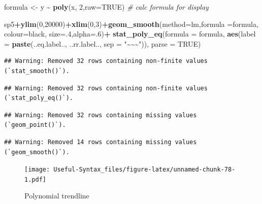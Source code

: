 \documentclass[
]{article}
\newenvironment{Shaded}{\begin{snugshade}}{\end{snugshade}}
\newcommand{\AttributeTok}[1]{\textcolor[rgb]{0.13,0.29,0.53}{#1}}
\newcommand{\CommentTok}[1]{\textcolor[rgb]{0.56,0.35,0.01}{\textit{#1}}}
\newcommand{\ConstantTok}[1]{\textcolor[rgb]{0.56,0.35,0.01}{#1}}
\newcommand{\DecValTok}[1]{\textcolor[rgb]{0.00,0.00,0.81}{#1}}
\newcommand{\FunctionTok}[1]{\textcolor[rgb]{0.13,0.29,0.53}{\textbf{#1}}}
\newcommand{\NormalTok}[1]{#1}
\newcommand{\OtherTok}[1]{\textcolor[rgb]{0.56,0.35,0.01}{#1}}
\newcommand{\SpecialCharTok}[1]{\textcolor[rgb]{0.81,0.36,0.00}{\textbf{#1}}}
\newcommand{\StringTok}[1]{\textcolor[rgb]{0.31,0.60,0.02}{#1}}
\begin{document}
\begin{Shaded}
\begin{Highlighting}[]
\NormalTok{formula }\OtherTok{\textless{}{-}}\NormalTok{ y }\SpecialCharTok{\textasciitilde{}} \FunctionTok{poly}\NormalTok{(x, }\DecValTok{2}\NormalTok{,}\AttributeTok{raw=}\ConstantTok{TRUE}\NormalTok{) }\CommentTok{\# calc formula for display}

\NormalTok{sp5}\SpecialCharTok{+}\FunctionTok{ylim}\NormalTok{(}\DecValTok{0}\NormalTok{,}\DecValTok{20000}\NormalTok{)}\SpecialCharTok{+}\FunctionTok{xlim}\NormalTok{(}\DecValTok{0}\NormalTok{,}\DecValTok{3}\NormalTok{)}\SpecialCharTok{+}\FunctionTok{geom\_smooth}\NormalTok{(}\AttributeTok{method=}\StringTok{\textquotesingle{}lm\textquotesingle{}}\NormalTok{,}\AttributeTok{formula =}\NormalTok{formula,}
                                        \AttributeTok{colour=}\StringTok{\textquotesingle{}black\textquotesingle{}}\NormalTok{, }\AttributeTok{size=}\NormalTok{.}\DecValTok{4}\NormalTok{,}\AttributeTok{alpha=}\NormalTok{.}\DecValTok{6}\NormalTok{)}\SpecialCharTok{+}
  \FunctionTok{stat\_poly\_eq}\NormalTok{(}\AttributeTok{formula =}\NormalTok{ formula,}
               \FunctionTok{aes}\NormalTok{(}\AttributeTok{label =} \FunctionTok{paste}\NormalTok{(..eq.label.., ..rr.label..,}
                                                        \AttributeTok{sep =} \StringTok{"\textasciitilde{}\textasciitilde{}\textasciitilde{}"}\NormalTok{)), }\AttributeTok{parse =} \ConstantTok{TRUE}\NormalTok{)}
\end{Highlighting}
\end{Shaded}

\begin{verbatim}
## Warning: Removed 32 rows containing non-finite values (`stat_smooth()`).
\end{verbatim}

\begin{verbatim}
## Warning: Removed 32 rows containing non-finite values (`stat_poly_eq()`).
\end{verbatim}

\begin{verbatim}
## Warning: Removed 32 rows containing missing values (`geom_point()`).
\end{verbatim}

\begin{verbatim}
## Warning: Removed 14 rows containing missing values (`geom_smooth()`).
\end{verbatim}

\begin{figure}
\centering
\texttt{[image: Useful-Syntax\_files/figure-latex/unnamed-chunk-78-1.pdf]}
\caption{\label{fig:unnamed-chunk-78}Polynomial trendline}
\end{figure}
\end{document}
